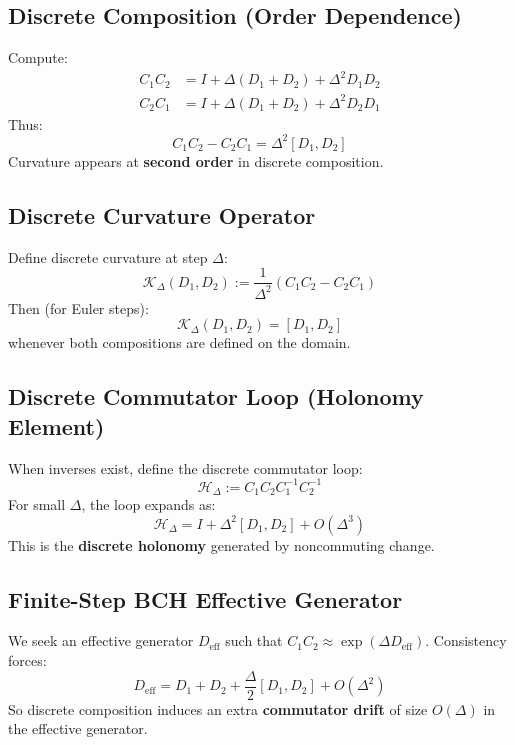 \documentclass[12pt, oneside]{article}
\begin{document}
\subsection{Discrete Composition (Order Dependence)}

Compute:
\begin{align}
C_1 C_2 &= I + \Delta(D_1 + D_2) + \Delta^2 D_1 D_2 \\
C_2 C_1 &= I + \Delta(D_1 + D_2) + \Delta^2 D_2 D_1
\end{align}
Thus:
\begin{equation}
C_1 C_2 - C_2 C_1 = \Delta^2 [D_1, D_2]
\end{equation}
Curvature appears at \textbf{second order} in discrete composition.

\subsection{Discrete Curvature Operator}

Define discrete curvature at step $\Delta$:
\begin{equation}
\mathcal{K}_\Delta(D_1, D_2) := \frac{1}{\Delta^2} (C_1 C_2 - C_2 C_1)
\end{equation}
Then (for Euler steps):
\begin{equation}
\mathcal{K}_\Delta(D_1, D_2) = [D_1, D_2]
\end{equation}
whenever both compositions are defined on the domain.

\subsection{Discrete Commutator Loop (Holonomy Element)}

When inverses exist, define the discrete commutator loop:
\begin{equation}
\mathcal{H}_\Delta := C_1 C_2 C_1^{-1} C_2^{-1}
\end{equation}
For small $\Delta$, the loop expands as:
\begin{equation}
\mathcal{H}_\Delta = I + \Delta^2 [D_1, D_2] + O(\Delta^3)
\end{equation}
This is the \textbf{discrete holonomy} generated by noncommuting change.

\subsection{Finite-Step BCH Effective Generator}

We seek an effective generator $D_{\text{eff}}$ such that $C_1 C_2 \approx \exp(\Delta D_{\text{eff}})$. Consistency forces:
\begin{equation}
D_{\text{eff}} = D_1 + D_2 + \frac{\Delta}{2} [D_1, D_2] + O(\Delta^2)
\end{equation}
So discrete composition induces an extra \textbf{commutator drift} of size $O(\Delta)$ in the effective generator.
\end{document}
